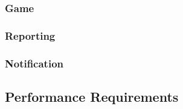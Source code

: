 \documentclass{article}
\begin{document}
    	\subsubsection{Game}
    	
    	\subsubsection{Reporting}
    	
    	\subsubsection{Notification}
    	
        	
        \subsection{Performance Requirements}
\end{document}

